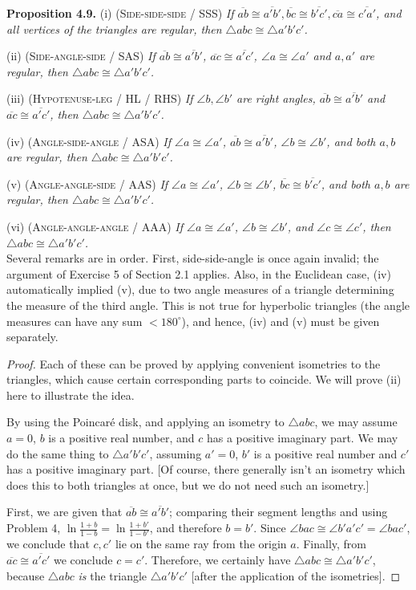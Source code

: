 \documentclass[leqno]{book}
\begin{document}
\noindent\textbf{Proposition 4.9.} (i) \textsc{(Side-side-side / SSS)} \emph{If $\overline{ab}\cong\overline{a'b'},\overline{bc}\cong\overline{b'c'},\overline{ca}\cong\overline{c'a'}$, and all vertices of the triangles are regular, then $\triangle abc\cong\triangle a'b'c'$.}

(ii) \textsc{(Side-angle-side / SAS)} \emph{If $\overline{ab}\cong\overline{a'b'}$, $\overline{ac}\cong\overline{a'c'}$, $\angle a\cong\angle a'$ and $a,a'$ are regular, then $\triangle abc\cong\triangle a'b'c'$.}

(iii) \textsc{(Hypotenuse-leg / HL / RHS)} \emph{If $\angle b,\angle b'$ are right angles, $\overline{ab}\cong\overline{a'b'}$ and $\overline{ac}\cong\overline{a'c'}$, then $\triangle abc\cong\triangle a'b'c'$.}

(iv) \textsc{(Angle-side-angle / ASA)} \emph{If $\angle a\cong\angle a'$, $\overline{ab}\cong\overline{a'b'}$, $\angle b\cong\angle b'$, and both $a,b$ are regular, then $\triangle abc\cong\triangle a'b'c'$.}

(v) \textsc{(Angle-angle-side / AAS)} \emph{If $\angle a\cong\angle a'$, $\angle b\cong\angle b'$, $\overline{bc}\cong\overline{b'c'}$, and both $a,b$ are regular, then $\triangle abc\cong\triangle a'b'c'$.}

(vi) \textsc{(Angle-angle-angle / AAA)} \emph{If $\angle a\cong\angle a'$, $\angle b\cong\angle b'$, and $\angle c\cong\angle c'$, then $\triangle abc\cong\triangle a'b'c'$.}\\

\noindent Several remarks are in order.  First, side-side-angle is once again invalid; the argument of Exercise 5 of Section 2.1 applies.  Also, in the Euclidean case, (iv) automatically implied (v), due to two angle measures of a triangle determining the measure of the third angle.  This is not true for hyperbolic triangles (the angle measures can have any sum $<180^\circ$), and hence, (iv) and (v) must be given separately.
\begin{proof}
Each of these can be proved by applying convenient isometries to the triangles, which cause certain corresponding parts to coincide.  We will prove (ii) here to illustrate the idea.

By using the Poincar\'e disk, and applying an isometry to $\triangle abc$, we may assume $a=0$, $b$ is a positive real number, and $c$ has a positive imaginary part.  We may do the same thing to $\triangle a'b'c'$, assuming $a'=0$, $b'$ is a positive real number and $c'$ has a positive imaginary part.  [Of course, there generally isn't an isometry which does this to both triangles at once, but we do not need such an isometry.]

First, we are given that $\overline{ab}\cong\overline{a'b'}$; comparing their segment lengths and using Problem 4, $\ln\frac{1+b}{1-b}=\ln\frac{1+b'}{1-b'}$, and therefore $b=b'$.  Since $\angle bac\cong\angle b'a'c'=\angle bac'$, we conclude that $c,c'$ lie on the same ray from the origin $a$.  Finally, from $\overline{ac}\cong\overline{a'c'}$ we conclude $c=c'$.  Therefore, we certainly have $\triangle abc\cong\triangle a'b'c'$, because $\triangle abc$ \emph{is} the triangle $\triangle a'b'c'$ [after the application of the isometries].
\end{proof}
\end{document}
